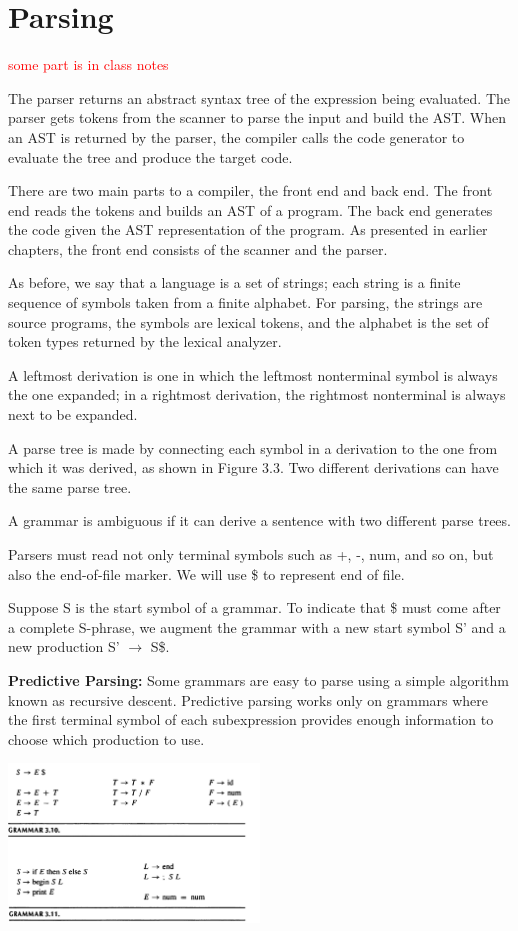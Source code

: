 \documentclass[8pt, a4paper, oneside, twocolumn]{extarticle}
\begin{document}
\section{Parsing}

\textcolor{red}{some part is in class notes}

The parser returns an abstract syntax tree of the expression being evaluated. The parser gets tokens from the scanner to parse the input and build the AST. When an AST is
returned by the parser, the compiler calls the code generator to evaluate the tree and produce the target code.

There are two main parts to a compiler, the front end and back end. The front end
reads the tokens and builds an AST of a program. The back end generates the code
given the AST representation of the program. As presented in earlier chapters, the
front end consists of the scanner and the parser.

As before, we say that a language is a set of strings; each string is a finite
sequence of symbols taken from a finite alphabet. For parsing, the strings are
source programs, the symbols are lexical tokens, and the alphabet is the set
of token types returned by the lexical analyzer.

A leftmost
derivation is one in which the leftmost nonterminal symbol is always the one
expanded; in a rightmost derivation, the rightmost nonterminal is always next
to be expanded.

A parse tree is made by connecting each symbol in a derivation to the one
from which it was derived, as shown in Figure 3.3. Two different derivations
can have the same parse tree.

A grammar is ambiguous if it can derive a sentence with two different parse
trees.

Parsers must read not only terminal symbols such as +, -, num, and so on, but
also the end-of-file marker. We will use \$ to represent end of file.

Suppose S is the start symbol of a grammar. To indicate that \$ must come
after a complete S-phrase, we augment the grammar with a new start symbol
S' and a new production S' $\rightarrow$ S\$.

\textbf{Predictive Parsing:} Some grammars are easy to parse using a simple algorithm known as 
recursive descent. Predictive parsing works only on grammars where
the first terminal symbol of each subexpression provides enough information
to choose which production to use.

\includegraphics[width=0.5\textwidth,height=0.5\textheight,keepaspectratio]{pp}
\end{document}
